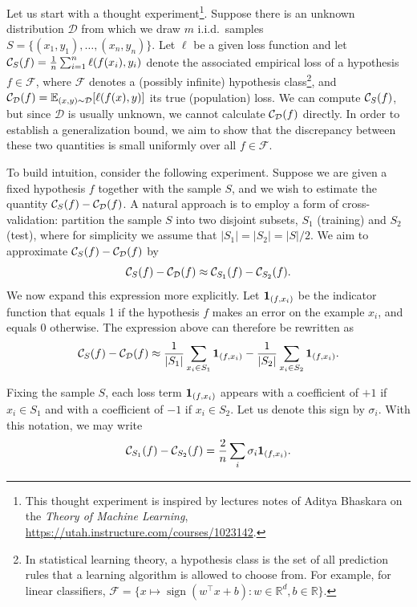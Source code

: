 Let us start with a thought experiment\footnote{This thought experiment is inspired by lectures notes of Aditya Bhaskara on the {\em Theory of Machine Learning}, \url{https://utah.instructure.com/courses/1023142}.}. 
Suppose there is an unknown distribution ${\mathcal D}$ from which we draw $m$ i.i.d.\ samples 
$S = \{(x_1, y_1), \dots, (x_n, y_n)\}$. Let
$\ell$ be a given loss function and
let ${\mathcal C}_S(f)=\frac{1}{n} \sum_{i=1}^n \ell(f(x_i), y_i)$ denote the associated empirical loss of a hypothesis $f \in {\mathcal F}$, where ${\mathcal F}$ denotes a (possibly infinite) hypothesis class\footnote{In statistical learning theory, a hypothesis class is the set of all prediction rules that a learning algorithm is allowed to choose from. For example, for linear classifiers,  $\mathcal{F} = \{ x \mapsto \operatorname{sign}(w^\top x + b) : w \in \mathbb{R}^d, b \in \mathbb{R} \}$.}, and ${\mathcal C}_{\mathcal D}(f) = \mathbb{E}_{(x,y) \sim {\mathcal D}} [\ell(f(x), y)]$ its true (population) loss. We can compute ${\mathcal C}_S(f)$, but
since ${\mathcal D}$ is usually unknown, we cannot calculate ${\mathcal C}_{\mathcal D}(f)$ directly.
In order to establish a generalization bound, we aim to show that the discrepancy between these two quantities is small uniformly over all $f \in {\mathcal F}$. 

To build intuition, consider the following experiment. Suppose we are given a fixed hypothesis $f$ together with the sample $S$, and we wish to estimate the quantity ${\mathcal C}_S(f) - {\mathcal C}_{\mathcal D}(f)$. A natural approach is to employ a form of cross-validation: partition the sample $S$ into two disjoint subsets, $S_1$ (training) and $S_2$ (test), where for simplicity we assume that $|S_1| = |S_2| = |S|/2$. We aim to approximate ${\mathcal C}_S(f) - {\mathcal C}_{\mathcal D}(f)$ by
$$
{\mathcal C}_S(f) - {\mathcal C}_{\mathcal D}(f) \approx {\mathcal C}_{S_1}(f) - {\mathcal C}_{S_2}(f).
$$
We now expand this expression more explicitly. Let ${\textbf 1}_{(f, x_i)}$ be the indicator function that equals 1 if the hypothesis $f$ makes an error on the example $x_i$, and equals $0$ otherwise.
The expression above can therefore be rewritten as
\begin{equation}\label{eq:rademacher1}
{\mathcal C}_S(f) - {\mathcal C}_{\mathcal D}(f)
\approx
\frac{1}{|S_1|}\sum_{x_i \in S_1} {\textbf 1}_{(f, x_i)} 
- \frac{1}{|S_2|}\sum_{x_i \in S_2} {\textbf 1}_{(f, x_i)}.
\end{equation}
 
Fixing the sample $S$, each loss term ${\textbf 1}_{(f, x_i)}$ appears with a coefficient of $+1$ if $x_i \in S_1$ and with a coefficient of $-1$ if $x_i \in S_2$. Let us denote this sign by $\sigma_i$. With this notation, we may write
$$
{\mathcal C}_{S_1}(f) - {\mathcal C}_{S_2}(f) = \frac{2}{n} \sum_i \sigma_i 
{\textbf 1}_{(f, x_i)}.$$


